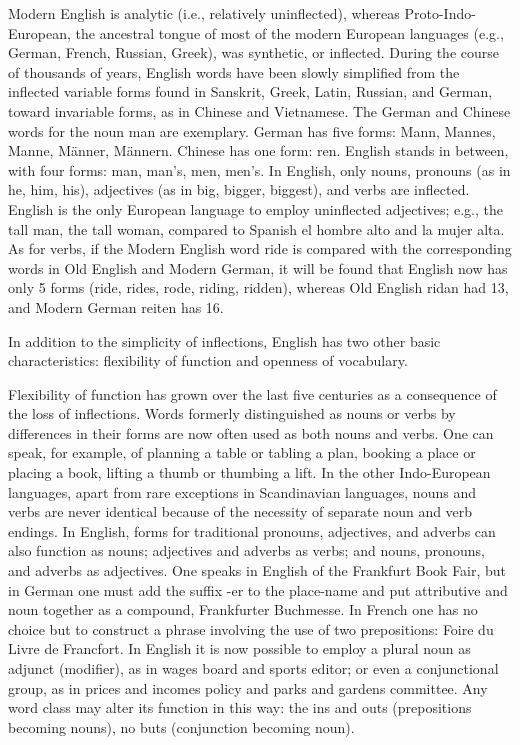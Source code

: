 \documentclass[12pt]{report}
\begin{document}
Modern English is analytic (i.e., relatively uninflected), whereas
Proto-Indo-European, the ancestral tongue of most of the modern European
languages (e.g., German, French, Russian, Greek), was synthetic, or inflected.
During the course of thousands of years, English words have been slowly
simplified from the inflected variable forms found in Sanskrit, Greek, Latin,
Russian, and German, toward invariable forms, as in Chinese and Vietnamese. The
German and Chinese words for the noun man are exemplary. German has five forms:
Mann, Mannes, Manne, Männer, Männern. Chinese has one form: ren. English stands
in between, with four forms: man, man’s, men, men’s. In English, only nouns,
pronouns (as in he, him, his), adjectives (as in big, bigger, biggest), and verbs
are inflected. English is the only European language to employ uninflected
adjectives; e.g., the tall man, the tall woman, compared to Spanish el hombre
alto and la mujer alta. As for verbs, if the Modern English word ride is compared
with the corresponding words in Old English and Modern German, it will be found
that English now has only 5 forms (ride, rides, rode, riding, ridden), whereas
Old English ridan had 13, and Modern German reiten has 16.

In addition to the simplicity of inflections, English has two other basic
characteristics: flexibility of function and openness of vocabulary.

Flexibility of function has grown over the last five centuries as a consequence
of the loss of inflections. Words formerly distinguished as nouns or verbs by
differences in their forms are now often used as both nouns and verbs. One can
speak, for example, of planning a table or tabling a plan, booking a place or
placing a book, lifting a thumb or thumbing a lift. In the other Indo-European
languages, apart from rare exceptions in Scandinavian languages, nouns and verbs
are never identical because of the necessity of separate noun and verb endings.
In English, forms for traditional pronouns, adjectives, and adverbs can also
function as nouns; adjectives and adverbs as verbs; and nouns, pronouns, and
adverbs as adjectives. One speaks in English of the Frankfurt Book Fair, but in
German one must add the suffix -er to the place-name and put attributive and noun
together as a compound, Frankfurter Buchmesse. In French one has no choice but to
construct a phrase involving the use of two prepositions: Foire du Livre de
Francfort. In English it is now possible to employ a plural noun as adjunct
(modifier), as in wages board and sports editor; or even a conjunctional group,
as in prices and incomes policy and parks and gardens committee. Any word class
may alter its function in this way: the ins and outs (prepositions becoming
nouns), no buts (conjunction becoming noun).
\end{document}
